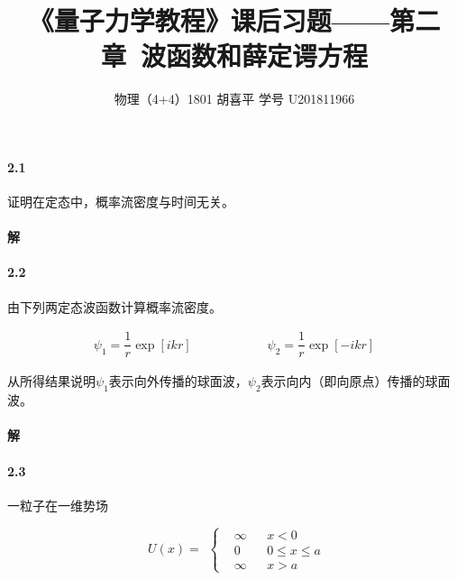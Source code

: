 \documentclass{article}
\author{物理（4+4）1801 \quad 胡喜平 \quad 学号 U201811966}
\affil{网站 https://hxp.plus/ \quad 邮件 hxp201406@gmail.com}
\title{《量子力学教程》课后习题——第二章\ 波函数和薛定谔方程}
\begin{document}
\maketitle\thispagestyle{fancy}


\paragraph{2.1}

证明在定态中，概率流密度与时间无关。

\paragraph{解}

\paragraph{2.2}

由下列两定态波函数计算概率流密度。

\begin{equation*}
  \begin{aligned}
    \psi_1 = \dfrac{1}{r} \exp \left[ i k r \right]
    \quad\quad \quad\quad \quad\quad 
    \psi_2 = \dfrac{1}{r} \exp \left[ - i k r \right] 
  \end{aligned}
\end{equation*}

从所得结果说明$\psi_1$表示向外传播的球面波，$\psi_2$表示向内（即向原点）传播的球面波。

\paragraph{解}

\paragraph{2.3}

一粒子在一维势场

\begin{equation*}
  \begin{aligned}
    U \left( x \right) =
  \end{aligned}
  \left\{
  \begin{aligned}
    & \infty && x<0 \\
    & 0 && 0 \leq x \leq a \\
    & \infty && x>a
  \end{aligned}
  \right.
\end{equation*}
\end{document}
